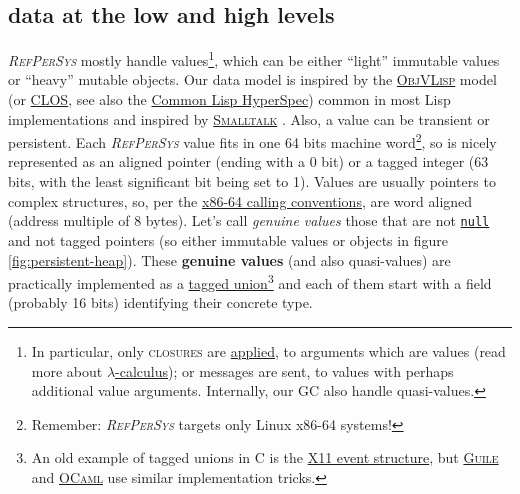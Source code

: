 \documentclass[11pt,a4paper,svgnames]{article}
\newcommand{\RefPerSys}{{\textit{\textsc{RefPerSys}}}}
\begin{document}
\label{subsec:datalowhigh}
\subsection{data at the low and high levels}

{\RefPerSys} mostly handle values\footnote{In particular, only
\textsc{closures} are
\href{https://en.wikipedia.org/wiki/Function_application}{applied}, to
arguments which are values (read more about
\href{https://en.wikipedia.org/wiki/Lambda_calculus}{$\lambda$-calculus});
or messages are sent, to values with perhaps additional value
arguments. Internally, our GC also handle quasi-values.}, which can be
either ``light'' immutable values or ``heavy'' mutable objects. Our
data model is inspired by the
\href{https://en.wikipedia.org/wiki/ObjVlisp}{\textsc{ObjVLisp}} model
(or
\href{https://en.wikipedia.org/wiki/Common_Lisp_Object_System}{\textsc{CLOS}},
see also the
\href{http://www.lispworks.com/documentation/HyperSpec/Front/index.htm}{Common
  Lisp HyperSpec}) common in most Lisp implementations
\cite{queinnec:2003:lisp, cointe:1987:metaclasses, briot:1987:uniform}
and inspired by
\href{https://en.wikipedia.org/wiki/Smalltalk}{\textsc{Smalltalk}}
\cite{kay:1996:early-smalltalk}. Also, a value can be transient or
persistent. Each {\RefPerSys} value fits in one 64 bits machine
word\footnote{Remember: {\RefPerSys} targets only Linux x86-64
systems!}, so is nicely represented as an aligned pointer (ending with
a 0 bit) or a tagged integer (63 bits, with the least significant bit
being set to 1). Values are usually pointers to complex structures,
so, per the
\href{https://github.com/hjl-tools/x86-psABI/wiki/x86-64-psABI-1.0.pdf}{x86-64
  calling conventions}, are word aligned (address multiple of 8
bytes). Let's call \emph{genuine values}  those
that are not
\href{https://medium.com/@hinchman_amanda/null-pointer-references-the-billion-dollar-mistake-1e616534d485}{\texttt{null}}
and not tagged pointers (so either immutable values or objects in
figure \ref{fig:persistent-heap}). These \textbf{genuine values} (and
also quasi-values) are practically implemented as a \href{
  https://en.wikipedia.org/wiki/Tagged_union}{tagged
  union}\footnote{An old example of tagged unions in C is the
\href{https://tronche.com/gui/x/xlib/events/structures.html}{X11 event
  structure}, but
\href{https://www.gnu.org/software/guile/manual/html\_node/A-Simple-Representation.html}{\textsc{Guile}}
and
\href{https://caml.inria.fr/pub/docs/manual-ocaml/intfc.html}{\textsc{OCaml}}
use similar implementation tricks.} and each of them start with a
field (probably 16 bits) identifying their concrete type.
\end{document}
